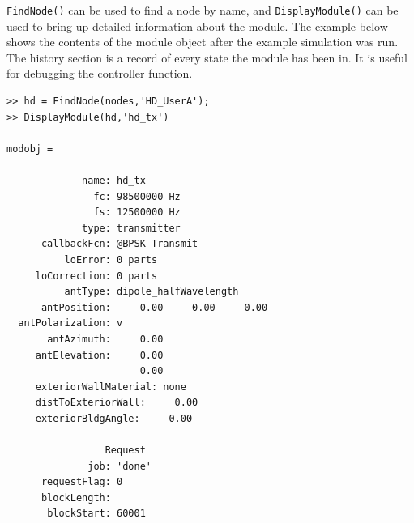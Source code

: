 \verb+FindNode()+ can be used to find a node by name, and
\verb+DisplayModule()+ can be used to bring up detailed information
about the module.  The example below shows the contents of the
module object after the example simulation was run.  The history
section is a record of every state the module has been in.  It is
useful for debugging the controller function.

\begin{lstlisting}[numbers=none]
>> hd = FindNode(nodes,'HD_UserA');
>> DisplayModule(hd,'hd_tx')

modobj = 

             name: hd_tx
               fc: 98500000 Hz
               fs: 12500000 Hz
             type: transmitter
      callbackFcn: @BPSK_Transmit
          loError: 0 parts
     loCorrection: 0 parts
          antType: dipole_halfWavelength
      antPosition:     0.00     0.00     0.00 
  antPolarization: v
       antAzimuth:     0.00 
     antElevation:     0.00 
                       0.00 
     exteriorWallMaterial: none 
     distToExteriorWall:     0.00 
     exteriorBldgAngle:     0.00 

                 Request
              job: 'done'
      requestFlag: 0
      blockLength: 
       blockStart: 60001


\end{lstlisting}
